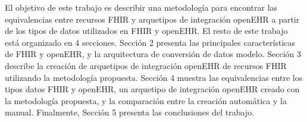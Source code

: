 El objetivo de este trabajo es describir una metodología para encontrar las equivalencias entre recursos FHIR y arquetipos de integración openEHR a partir de los tipos de datos utilizados en FHIR y openEHR. El resto de este trabajo está organizado en 4 secciones. Sección 2 presenta las principales características de FHIR y openEHR, y la arquitectura de conversión de datos modelo. Sección 3 describe la creación de arquetipos de integración openEHR de recursos FHIR utilizando la metodología propuesta. Sección 4 muestra las equivalencias entre los tipos datos FHIR y openEHR, un arquetipo de integración openEHR creado con la metodología propuesta, y la comparación entre la creación automática y la manual. Finalmente, Sección 5 presenta las conclusiones del trabajo.
